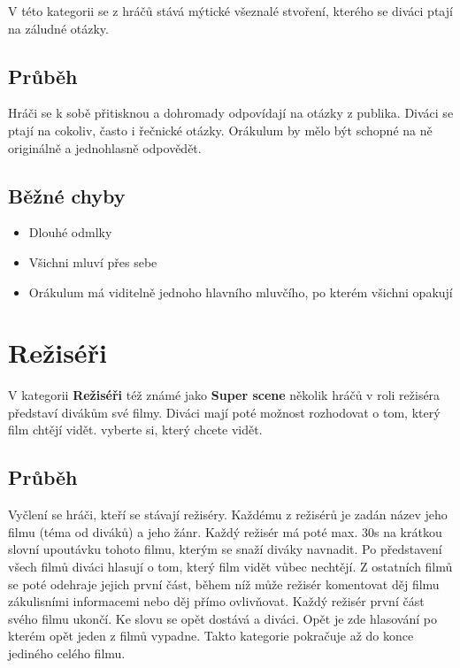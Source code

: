 \documentclass[main.tex]{subfiles}
\begin{document}
V této kategorii se z hráčů stává mýtické všeznalé stvoření, kterého se diváci ptají na záludné otázky. 
 
\subsection{ Průběh } Hráči se k sobě přitisknou a dohromady odpovídají na otázky z publika. Diváci se ptají na cokoliv, často i řečnické otázky. Orákulum by mělo být schopné na ně originálně a jednohlasně odpovědět. 
 
\subsection{ Běžné chyby } \begin{itemize}
\item Dlouhé odmlky
\item Všichni mluví přes sebe
\item Orákulum má viditelně jednoho hlavního mluvčího, po kterém všichni opakují
\end{itemize}
 
 
 
 
\needspace{5cm} \section{Režiséři} \label{režiséři}  
 
V kategorii \textbf{Režiséři}{} též známé jako \textbf{Super scene}{} několik hráčů v roli režiséra představí divákům své filmy. Diváci mají poté možnost rozhodovat o tom, který film chtějí vidět. vyberte si, který chcete vidět. 
 
\subsection{Průběh} Vyčlení se hráči, kteří se stávají režiséry. Každému z režisérů je zadán název jeho filmu (téma od diváků) a jeho žánr. Každý režisér má poté max. 30s na krátkou slovní upoutávku tohoto filmu, kterým se snaží diváky navnadit. Po představení všech filmů diváci hlasují o tom, který film vidět vůbec nechtějí. Z ostatních filmů se poté odehraje jejich první část, během níž může režisér komentovat děj filmu zákulisními informacemi nebo děj přímo ovlivňovat. Každý režisér první část svého filmu ukončí. Ke slovu se opět dostává  a diváci. Opět je zde hlasování po kterém opět jeden z filmů vypadne. Takto kategorie pokračuje až do konce jediného celého filmu. 
 
\end{document}
